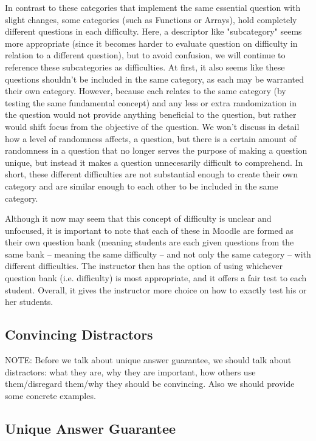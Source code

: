 \documentclass{article}
\begin{document}
In contrast to these categories that implement the same essential question with slight changes, some categories (such as Functions
or Arrays), hold completely different questions in each difficulty. Here, a descriptor like "subcategory" seems more appropriate
(since it becomes harder to evaluate question on difficulty in relation to a different question), but
to avoid confusion, we will continue to reference these subcategories as difficulties. At first, it also seems like these questions shouldn't
be included in the same category, as each may be warranted their own category. However, because each relates to the same category
(by testing the same fundamental concept) and any less or extra randomization in the question would not provide anything beneficial to
the question, but rather would shift focus from the objective of the question. We won't discuss in detail how a level of randomness affects,
a question, but there is a certain amount of randomness in a question that no longer serves the purpose of making a question unique,
but instead it makes a question unnecesarily difficult to comprehend. In short, these different difficulties are not substantial enough to
create their own category and are similar enough to each other to be included in the same category.

Although it now may seem that this concept of difficulty is unclear and unfocused, it is important to note that each of these in Moodle are
formed as their own question bank (meaning students are each given questions from the same bank -- meaning the same difficulty -- and not only
the same category -- with different difficulties. The instructor then has the option of using whichever question bank (i.e. difficulty) is most appropriate,
and it offers a fair test to each student. Overall, it gives the instructor more choice on how to exactly test his or her students.

\subsection{Convincing Distractors}

NOTE: Before we talk about unique answer guarantee, we should talk about distractors: what they are, why they are important, how others use them/disregard them/why they should be convincing. Also we should provide some concrete examples.

\subsection{Unique Answer Guarantee}
\end{document}
